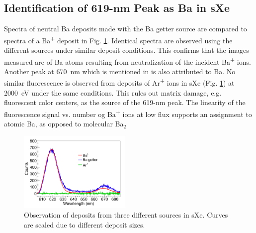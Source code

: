 \documentclass[aps,pra,reprint,superscriptaddress]{revtex4-1}
\begin{document}


\subsection{Identification of 619-nm Peak as Ba in sXe}

Spectra of neutral Ba deposits made with the Ba getter source are compared to spectra of a Ba\textsuperscript{+} deposit in Fig. \ref{fig:ion_getter_ar}.  Identical spectra are observed using the different sources under similar deposit conditions.  This confirms that the images measured are of Ba atoms resulting from neutralization of the incident Ba\textsuperscript{+} ions.  Another peak at 670~nm which is mentioned in \cite{Mong2015} is also attributed to Ba.  No similar fluorescence is observed from deposits of Ar\textsuperscript{+} ions in sXe (Fig. \ref{fig:ion_getter_ar}) at 2000~eV under the same conditions.  This rules out matrix damage, e.g. fluorescent color centers, as the source of the 619-nm peak.  The linearity of the fluorescence signal vs. number og Ba\textsuperscript{+} ions at low flux supports an assignment to atomic Ba, as opposed to molecular Ba$_{2}$

\begin{figure}
\includegraphics[width=0.48\textwidth]{figures/getter_fromthesis_Ar_vs_Ba.png}
\caption{Observation of deposits from three different sources in sXe.  Curves are scaled due to different deposit sizes.}
\label{fig:ion_getter_ar}
\end{figure}

\end{document}
